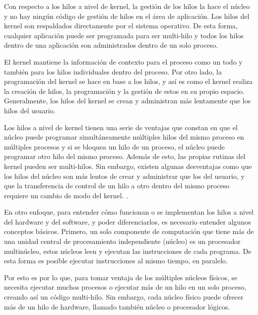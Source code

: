 \documentclass[12pt]{article}
\begin{document}
{Con respecto a los hilos a nivel de kernel, la gestión de los hilos la hace el núcleo y no hay ningún código de gestión de hilos en el área de aplicación. Los hilos del kernel son respaldados directamente por el sistema operativo. De esta forma, cualquier aplicación puede ser programada para ser multi-hilo y todos los hilos dentro de una aplicación son administrados dentro de un solo proceso.
\newline

El kernel mantiene la información de contexto para el proceso como un todo y también para los hilos individuales dentro del proceso. Por otro lado, la programación del kernel se hace en base a los hilos, y así es como el kernel realiza la creación de hilos, la programación y la gestión de estos en su propio espacio. Generalmente, los hilos del kernel se crean y administran más lentamente que los hilos del usuario.
\newline

Los hilos a nivel de kernel tienen una serie de ventajas que constan en que el núcleo puede programar simultáneamente múltiples hilos del mismo proceso en múltiples procesos y si se bloquea un hilo de un proceso, el núcleo puede programar otro hilo del mismo proceso. Además de esto, las propias rutinas del kernel pueden ser multi-hilos. Sin embargo, existen algunas desventajas como que los hilos del núcleo son más lentos de crear y administrar que los del usuario, y que la transferencia de control de un hilo a otro dentro del mismo proceso requiere un cambio de modo del kernel. \citep{Tip}.
\newline

En otro enfoque, para entender cómo funcionan o se implementan los hilos a nivel del hardware y del software, y poder diferenciarlos, es necesario entender algunos conceptos básicos. Primero, un solo componente de computación que tiene más de una unidad central de procesamiento independiente (núcleo) es un procesador multinúcleo, estos núcleos leen y ejecutan las instrucciones de cada programa. De esta forma es posible ejecutar instrucciones al mismo tiempo, en paralelo.
\newline

Por esto es por lo que, para tomar ventaja de los múltiples núcleos físicos, se necesita ejecutar muchos procesos o ejecutar más de un hilo en un solo proceso, creando así un código multi-hilo. Sin embargo, cada núcleo físico puede ofrecer más de un hilo de hardware, llamado también núcleo o procesador lógicos.
\newline

}
\end{document}
